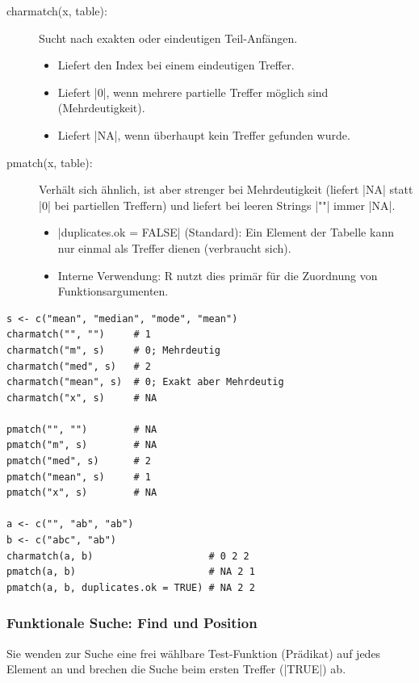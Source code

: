 \documentclass[10pt,twocolumn]{scrartcl}
\renewcommand{\lstinline}{\mycoloredinline}
\begin{document}
\begin{description}
\item[charmatch(x, table):] Sucht nach exakten oder eindeutigen Teil-Anfängen.
  \begin{itemize}
  \item Liefert den Index bei einem eindeutigen Treffer.
  \item Liefert \lstinline|0|, wenn mehrere partielle Treffer möglich sind (Mehrdeutigkeit).
  \item Liefert \lstinline|NA|, wenn überhaupt kein Treffer gefunden wurde.
  \end{itemize}
\item[pmatch(x, table):] Verhält sich ähnlich, ist aber strenger bei Mehrdeutigkeit (liefert \lstinline|NA| statt \lstinline|0| bei partiellen Treffern) und liefert bei leeren Strings \lstinline|""| immer \lstinline|NA|.
  \begin{itemize}
  \item \lstinline|duplicates.ok = FALSE| (Standard): Ein Element der Tabelle kann nur einmal als Treffer dienen (verbraucht sich).
  \item Interne Verwendung: R nutzt dies primär für die Zuordnung von Funktionsargumenten.
  \end{itemize}
\end{description}

\begin{lstlisting}
s <- c("mean", "median", "mode", "mean")
charmatch("", "")     # 1
charmatch("m", s)     # 0; Mehrdeutig
charmatch("med", s)   # 2
charmatch("mean", s)  # 0; Exakt aber Mehrdeutig
charmatch("x", s)     # NA

pmatch("", "")        # NA
pmatch("m", s)        # NA
pmatch("med", s)      # 2
pmatch("mean", s)     # 1
pmatch("x", s)        # NA

a <- c("", "ab", "ab")
b <- c("abc", "ab")
charmatch(a, b)                    # 0 2 2
pmatch(a, b)                       # NA 2 1
pmatch(a, b, duplicates.ok = TRUE) # NA 2 2
\end{lstlisting}


\subsubsection{Funktionale Suche: Find und Position}

Sie wenden zur Suche eine frei wählbare Test-Funktion (Prädikat) auf jedes Element an und brechen die Suche beim ersten Treffer (\lstinline|TRUE|) ab.
\end{document}
